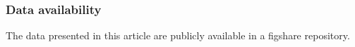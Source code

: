 \documentclass[9pt,twocolumn,twoside]{pnas-new}
\begin{document}
\subsubsection*{Data availability} The data presented in this article are publicly available in a figshare repository.


\end{document}
